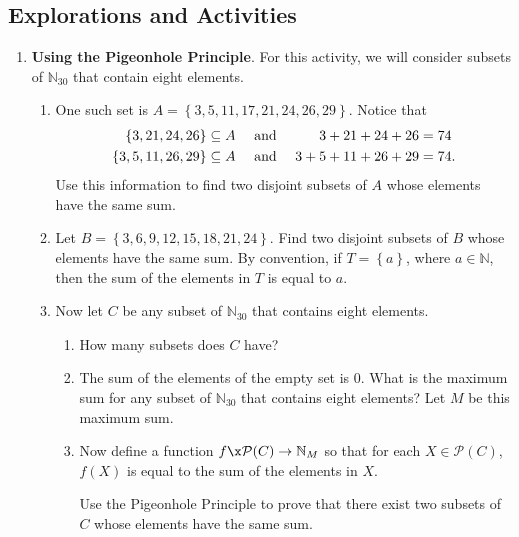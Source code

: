 \subsection*{Explorations and Activities}
\setcounter{oldenumi}{\theenumi}
\begin{enumerate} \setcounter{enumi}{\theoldenumi}
\item \textbf{Using the Pigeonhole Principle}.  \label{A:usingpigeon} 
%
For this activity, we will consider subsets of $\mathbb{N}_{30}$ that contain eight elements.  

\begin{enumerate}
\item One such set is $A = \left\{ 3, 5, 11, 17, 21, 24, 26, 29 \right\}$.  Notice that
\begin{align}
\left\{3, 21, 24, 26 \right\} &\subseteq A \quad \text{ and }   &3 + 21 + 24 + 26 &= 74 \notag \\
\left\{3, 5, 11, 26, 29 \right\} &\subseteq A \quad \text{ and }   &3 + 5 + 11 + 26 + 29 &= 74. \notag
\end{align}
Use this information to find two disjoint subsets of $A$ whose elements have the same sum.
\label{A:usingpigeon1}

\item Let $B = \left\{ 3, 6, 9, 12, 15, 18, 21, 24 \right\}$.  Find two disjoint subsets of $B$ whose elements have the same sum.  \note  By convention, if $T = \left\{ a \right\}$, where $a \in \mathbb{N}$, then the sum of the elements in $T$ is equal to $a$.

\item Now let $C$ be any subset of $\mathbb{N}_{30}$ that contains eight elements.
\begin{enumerate}
\item How many subsets does $C$ have?
\item The sum of the elements of the empty set is 0.  What is the maximum sum for any subset of 
$\mathbb{N}_{30}$ that contains eight elements?  Let $M$ be this maximum sum.


\item Now define a function $f\x \mathcal{P} ( C ) \to \mathbb{N}_M$ so that for each 
$X \in \mathcal{P} ( C )$, $f ( X )$ is equal to the sum of the elements in $X$.

Use the Pigeonhole Principle to prove that there exist two subsets of $C$ whose elements have the same sum. \label{A:usingpigeon3c}
\end{enumerate}


\end{enumerate}
\end{enumerate}

